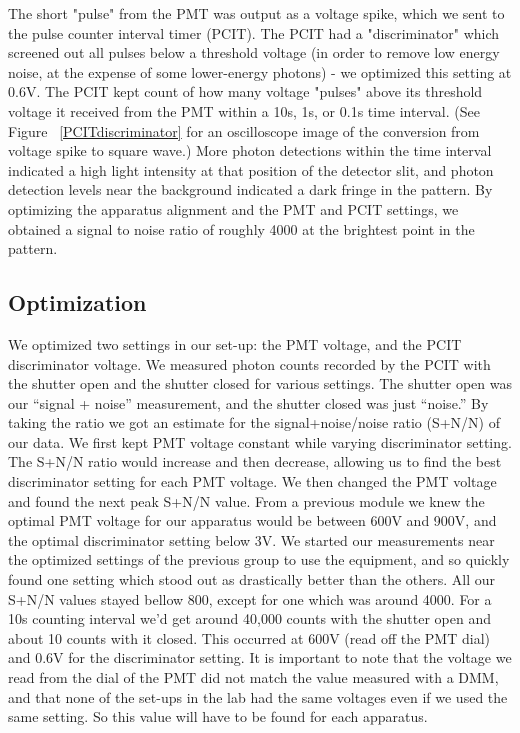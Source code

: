 \documentclass[prb,preprint]{revtex4-1}
\begin{document}
The short "pulse" from the PMT was output as a voltage spike, which we sent to the pulse counter interval timer (PCIT).  The PCIT had a "discriminator" which screened out all pulses below a threshold voltage (in order to remove low energy noise, at the expense of some lower-energy photons) - we optimized this setting at 0.6V. The PCIT kept count of how many voltage "pulses" above its threshold voltage it received from the PMT within a 10s, 1s, or 0.1s time interval. (See Figure ~\ref{PCITdiscriminator} for an oscilloscope image of the conversion from voltage spike to square wave.)  More photon detections within the time interval indicated a high light intensity at that position of the detector slit, and photon detection levels near the background indicated a dark fringe in the pattern. By optimizing the apparatus alignment and the PMT and PCIT settings, we obtained a signal to noise ratio of roughly 4000 at the brightest point in the pattern. 

\subsection{Optimization}
We optimized two settings in our set-up: the PMT voltage, and the PCIT discriminator voltage.  We measured photon counts recorded by the PCIT with the shutter open and the shutter closed for various settings.  The shutter open was our ``signal + noise'' measurement, and the shutter closed was just ``noise.'' By taking the ratio we got an estimate for the signal+noise/noise ratio (S+N/N) of our data. We first kept PMT voltage constant while varying discriminator setting.  The S+N/N ratio would increase and then decrease, allowing us to find the best discriminator setting for each PMT voltage.  We then changed the PMT voltage and found the next peak S+N/N value. From a previous module we knew the optimal PMT voltage for our apparatus would be between 600V and 900V, and the optimal discriminator setting below 3V.  We started our measurements near the optimized settings of the previous group to use the equipment, and so quickly found one setting which stood out as drastically better than the others.  All our S+N/N values stayed bellow 800, except for one which was around 4000.  For a 10s counting interval we'd get around 40,000 counts with the shutter open and about 10 counts with it closed.  This occurred at 600V (read off the PMT dial) and 0.6V for the discriminator setting. It is important to note that the voltage we read from the dial of the PMT did not match the value measured with a DMM, and that none of the set-ups in the lab had the same voltages even if we used the same setting.  So this value will have to be found for each apparatus. 
\end{document}
